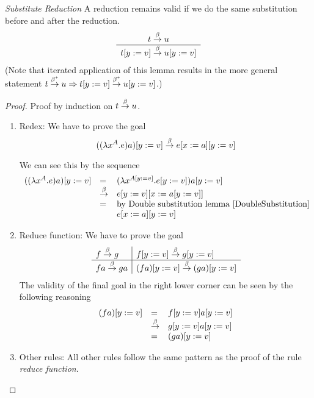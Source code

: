 \begin{theorem}
    \label{SubstituteReduction}
    \emph{Substitute Reduction} A reduction remains valid if we do the same
    substitution before and after the reduction.
    $$
    \begin{array}{c} 
        t \stackrel{\beta}{\to} u
     \\ \hline 
        t[y:=v] \stackrel{\beta}{\to} u[y:=v]
    \end{array}
    $$
    (Note that iterated application of this lemma results in the more general
    statement $t \stackrel{\beta^*}{\to} u \Rightarrow t[y:=v] \stackrel{\beta^*}{\to} u[y:=v]$.)

    \begin{proof}
        Proof by induction on $t \stackrel{\beta}{\to} u$.


        \begin{enumerate}

        \item Redex: We have to prove the goal
            $$
                ((\lambda x^A. e) a)[y:=v] \stackrel{\beta}{\to} e[x:=a][y:=v]
            $$

            We can see this by the sequence
            $$
            \begin{array}{lll}
                ((\lambda x^A. e) a)[y:=v]
                &=&
                (\lambda x^{A[y:=v]}. e[y:=v]) a[y:=v]
                \\
                &\stackrel{\beta}{\to}&
                e[y:=v][x:=a[y:=v]]
                \\
                &=& \text{by Double substitution lemma~\ref{DoubleSubstitution}}
                \\
                &&e[x:=a][y:=v]
            \end{array}
            $$

        \item Reduce function: We have to prove the goal
            $$
            \begin{array}{l|l}
                f \stackrel{\beta}{\to} g
                & f[y:=v] \stackrel{\beta}{\to} g[y:=v]
                \\
                \hline
                f a \stackrel{\beta}{\to} g a
                &(f a)[y:=v] \stackrel{\beta}{\to} (g a)[y:=v]
            \end{array}
            $$
            The validity of the final goal in the right lower corner can be seen
            by the following reasoning
            $$
            \begin{array}{lll}
                (f a)[y:=v]
                &=&
                f[y:=v] a[y:=v]
                \\
                &\stackrel{\beta}{\to}&
                g[y:=v] a[y:=v]
                \\
                &=&
                (g a)[y:=v]
            \end{array}
            $$

        \item Other rules: All other rules follow the same pattern as the proof
            of the rule \emph{reduce function}.
        \end{enumerate}
    \end{proof}
\end{theorem}





